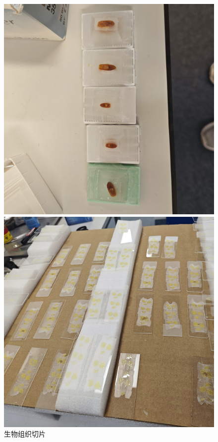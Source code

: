 \begin{figure}[htbp]
    \centering
    \begin{minipage}{0.3\textwidth}
        \centering
        \includegraphics[width=\textwidth]{./fig/sample.jpg}
        \caption{生物组织切片}
        \label{label:sample}
    \end{minipage}
    \begin{minipage}{0.3\textwidth}
        \centering
        \includegraphics[width=\textwidth]{./fig/采集样本.jpg}

\end{minipage}
\end{figure}
